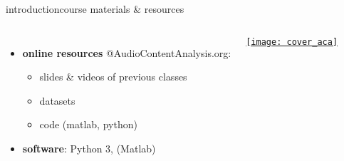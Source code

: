 \begin{frame}{introduction}{course materials \& resources}
\begin{columns}[T]
\begin{itemize}
                        \smallskip
                        \item<3->   \textbf{online resources} @AudioContentAnalysis.org: 
                            \begin{itemize}
                                \item   slides \& videos of previous classes
                                \item   datasets
                                \item    code (matlab, python)
                            \end{itemize}
                        \smallskip
                        \item<4->   \textbf{software}: Python 3, (Matlab)
                    \end{itemize}
                     \href{https://ieeexplore.ieee.org/servlet/opac?bknumber=6266785}{\texttt{[image: cover\_aca]}}
                    \vspace{40mm}
             \end{columns}
       \end{frame}


